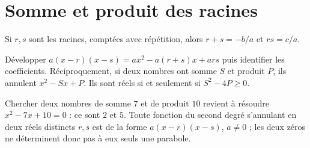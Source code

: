 \documentclass[../cours_1re.tex]{subfiles}
\begin{document}
\section{Somme et produit des racines}
\begin{propriete}
Si $r,s$ sont les racines, comptées avec répétition, alors
$r+s=-b/a$ et $rs=c/a$.
\end{propriete}
\begin{demonstration}
Développer $a(x-r)(x-s)=ax^2-a(r+s)x+ars$ puis identifier les coefficients.
Réciproquement, si deux nombres ont somme $S$ et produit $P$, ils annulent $x^2-Sx+P$. Ils sont réels si et seulement si $S^2-4P\ge0$.
\end{demonstration}
\begin{exemple}
Chercher deux nombres de somme $7$ et de produit $10$ revient à résoudre $x^2-7x+10=0$ : ce sont $2$ et $5$. Toute fonction du second degré s'annulant en deux réels distincts $r,s$ est de la forme $a(x-r)(x-s)$, $a\ne0$ ; les deux zéros ne déterminent donc pas à eux seuls une parabole.
\end{exemple}
\end{document}
